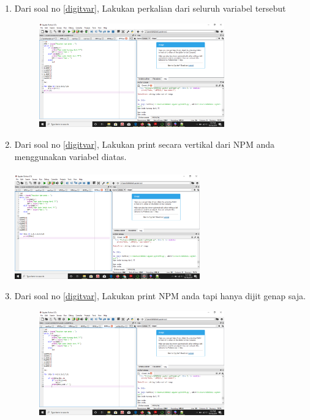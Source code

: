 \begin{enumerate}
\item 
Dari soal no \ref{digitvar}, Lakukan perkalian dari seluruh variabel tersebut
\begin{figure}[h]
\centerline{\includegraphics[width=8cm]{gambar/npm7.png}}
\end{figure}


\item
Dari soal no \ref{digitvar}, Lakukan print secara vertikal dari NPM anda menggunakan variabel diatas. 
\paragraph{}
\centerline{\includegraphics[width=8cm]{gambar/npm8.png}}


\item
Dari soal no \ref{digitvar}, Lakukan print NPM anda tapi hanya dijit genap saja. 
\begin{figure}[h]
\centerline{\includegraphics[width=8cm]{gambar/npm9.png}}
\end{figure}



\end{enumerate}
